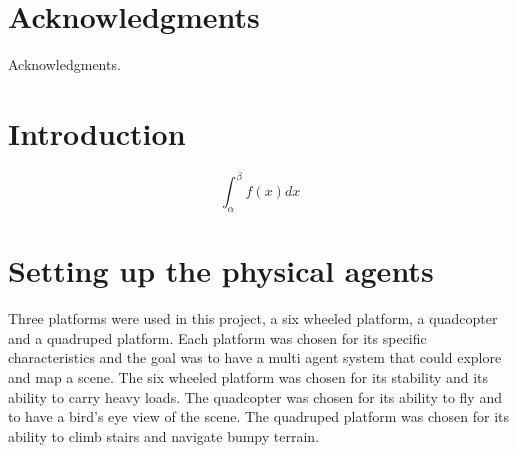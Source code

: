 \documentclass[11pt]{article}
\begin{document}
    \newpage
    \section*{Acknowledgments}

        Acknowledgments.
        
    \newpage
    \thispagestyle{empty}
    \mbox{}
    \newpage
    \thispagestyle{empty}
    {\small \tableofcontents}

    \newpage
    \thispagestyle{empty}
    \mbox{}
    \newpage
    
    \section{Introduction}
    

        $$
        \int_\alpha^\beta f(x) dx
        $$
        \cite{xu2022fast}


    \newpage
    
    \section[Setting up the physical agents]{Setting up the physical agents}
    \label{section:big title}%

        Three platforms were used in this project, a six wheeled platform, a quadcopter and a quadruped platform. Each platform was chosen for its specific characteristics and the goal was to have a multi agent system that could explore and map a scene. The six wheeled platform was chosen for its stability and its ability to carry heavy loads. The quadcopter was chosen for its ability to fly and to have a bird's eye view of the scene. The quadruped platform was chosen for its ability to climb stairs and navigate bumpy terrain.
\end{document}
